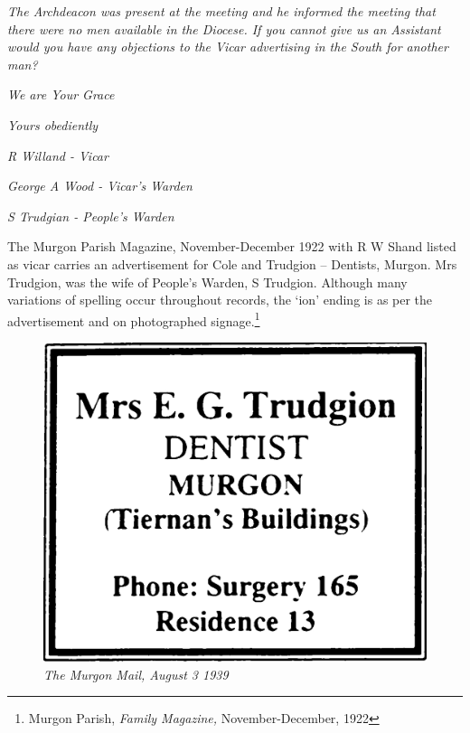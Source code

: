 \emph{The Archdeacon was present at the meeting and he informed the meeting that there were no men available in the Diocese. If you cannot give us an Assistant would you have any objections to the Vicar advertising in the South for another man?}



\emph{We are Your Grace}



\emph{Yours obediently}



\emph{R Willand - Vicar}



\emph{George A Wood - Vicar's Warden}



\emph{S Trudgian - People's Warden}



\smallskip


The Murgon Parish Magazine, November-December 1922 with R W Shand listed as vicar carries an advertisement for Cole and Trudgion -- Dentists, Murgon. Mrs Trudgion, was the wife of People's Warden, S Trudgion. Although many variations of spelling occur throughout records, the `ion' ending is as per the advertisement and on photographed signage.\footnote{Murgon Parish, \emph{Family Magazine,} November-December, 1922}








\begin{figure}[htb]
\begin{center}
\includegraphics[width=.6\textwidth,center]{../images/trudgionAd.jpg}
\caption{\itshape The Murgon Mail, August 3 1939}
\end{center}
\end{figure}




